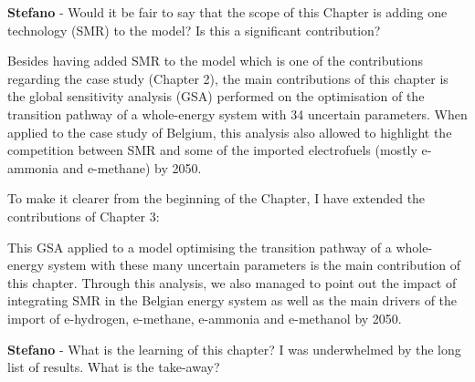 \documentclass[12pt,a4paper]{article}
\begin{document}
\begin{mdframed}[style=comment] %
{\color{orange} \textbf{Stefano}} - Would it be fair to say that the scope of this Chapter is adding one technology (SMR) to the model? Is this a significant contribution?
\end{mdframed}

\noindent Besides having added SMR to the model which is one of the contributions regarding the case study (Chapter 2), the main contributions of this chapter is the global sensitivity analysis (GSA) performed on the optimisation of the transition pathway of a whole-energy system with 34 uncertain parameters. When applied to the case study of Belgium, this analysis also allowed to highlight the competition between SMR and some of the imported electrofuels (mostly e-ammonia and e-methane) by 2050. 

To make it clearer from the beginning of the Chapter, I have extended {\color{blue}the contributions of Chapter 3}:

\begin{mdframed}[style=manuscript] %
This GSA applied to a model optimising the transition pathway of a whole-energy system with these many uncertain parameters is the main contribution of this chapter. Through this analysis, we also managed to point out the impact of integrating SMR in the Belgian energy system as well as the main drivers of the import of e-hydrogen, e-methane, e-ammonia and e-methanol by 2050.
\end{mdframed}

\begin{mdframed}[style=comment] %
{\color{orange} \textbf{Stefano}} - What is the learning of this chapter? I was underwhelmed by the long list of results. What is the take-away?
\end{mdframed}
\end{document}
